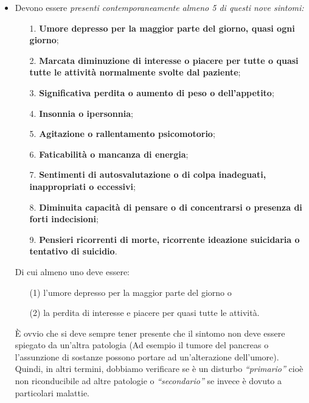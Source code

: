 \begin{itemize}
\item
  Devono essere \emph{\emph{presenti contemporaneamente almeno 5 di
  questi nove sintomi:}}
\begin{itemize}
\item[1.]
  \textbf{Umore depresso per la maggior parte del giorno, quasi ogni
  giorno};
\item[2.]
  \textbf{Marcata diminuzione di interesse o piacere per tutte o quasi
  tutte le attività normalmente svolte dal paziente};
\item[3.]
  \textbf{Significativa perdita o aumento di peso o dell'appetito};
\item[4.]
  \textbf{Insonnia o ipersonnia};
\item[5.]
  \textbf{Agitazione o rallentamento psicomotorio};
\item[6.]
  \textbf{Faticabilità o mancanza di energia};
\item[7.]
  \textbf{Sentimenti di autosvalutazione o di colpa inadeguati,
  inappropriati o eccessivi};
\item[8.]
  \textbf{Diminuita capacità di pensare o di concentrarsi o presenza
  di forti indecisioni};
\item[9.]
  \textbf{Pensieri ricorrenti di morte, ricorrente ideazione
  suicidaria o tentativo di suicidio}.
\end{itemize}

Di cui almeno uno deve essere: 
\begin{itemize}
\item[(1)]
l'umore depresso per la maggior parte del giorno o 
\item[(2)]
la perdita di interesse e piacere per quasi tutte le
attività.
\end{itemize}

È ovvio che si deve sempre tener presente che il sintomo non deve essere
spiegato da un'altra patologia (Ad esempio il tumore del pancreas o
l'assunzione di sostanze possono portare ad un'alterazione dell'umore).
Quindi, in altri termini, dobbiamo verificare se è un disturbo
\emph{``primario''} cioè non riconducibile ad altre patologie o
\emph{``secondario''} se invece è dovuto a particolari malattie.


\end{itemize}
